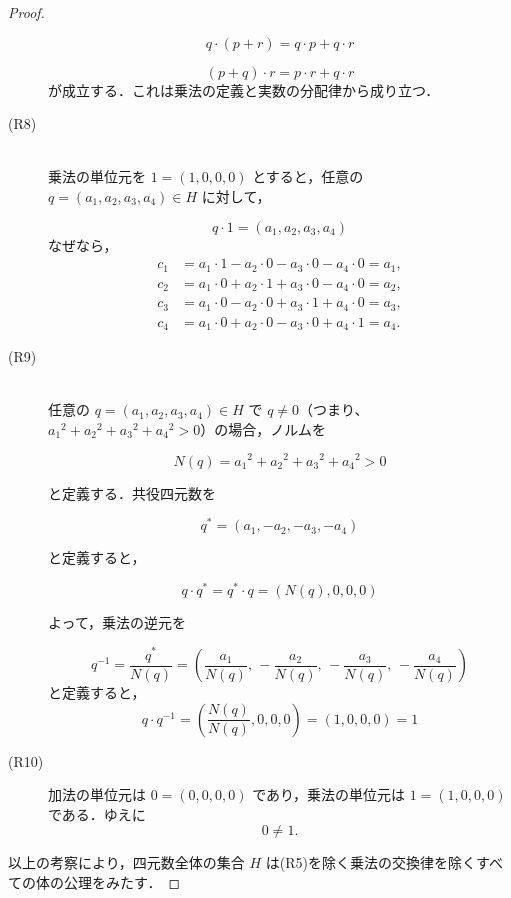 \begin{leftbar}
\begin{proof}
\begin{description}
                  \[
                      q \cdot (p + r) = q \cdot p + q \cdot r
                  \]

                  \[
                      (p + q) \cdot r = p \cdot r + q \cdot r
                  \]
                  が成立する．これは乗法の定義と実数の分配律から成り立つ．
            \item [(R8)] \mbox{} \\
                  乗法の単位元を $1 = (1, 0, 0, 0)$ とすると，任意の $q = (a_1, a_2, a_3, a_4) \in H$ に対して，

                  \[
                      q \cdot 1 = (a_1, a_2, a_3, a_4)
                  \]
                  なぜなら，
                  \begin{align*}
                      c_1 & = a_1 \cdot 1 - a_2 \cdot 0 - a_3 \cdot 0 - a_4 \cdot 0 = a_1, \\
                      c_2 & = a_1 \cdot 0 + a_2 \cdot 1 + a_3 \cdot 0 - a_4 \cdot 0 = a_2, \\
                      c_3 & = a_1 \cdot 0 - a_2 \cdot 0 + a_3 \cdot 1 + a_4 \cdot 0 = a_3, \\
                      c_4 & = a_1 \cdot 0 + a_2 \cdot 0 - a_3 \cdot 0 + a_4 \cdot 1 = a_4.
                  \end{align*}
            \item [(R9)] \mbox{} \\
                  任意の $q = (a_1, a_2, a_3, a_4) \in H$ で $q \ne 0$（つまり、${a_1}^2 + {a_2}^2 + {a_3}^2 + {a_4}^2 > 0$）の場合，ノルムを

                  \[
                      N(q) = {a_1}^2 + {a_2}^2 + {a_3}^2 + {a_4}^2 > 0
                  \]

                  と定義する．共役四元数を

                  \[
                      q^* = (a_1, -a_2, -a_3, -a_4)
                  \]

                  と定義すると，

                  \[
                      q \cdot q^* = q^* \cdot q = (N(q), 0, 0, 0)
                  \]

                  よって，乗法の逆元を

                  \[
                      q^{-1} = \frac{q^*}{N(q)} = \left( \frac{a_1}{N(q)},\, -\frac{a_2}{N(q)},\, -\frac{a_3}{N(q)},\, -\frac{a_4}{N(q)} \right)
                  \]
                  と定義すると，
                  \[
                      q \cdot q^{-1} = \left( \frac{N(q)}{N(q)}, 0, 0, 0 \right) = (1, 0, 0, 0) = 1
                  \]
            \item [(R10)]
                  加法の単位元は $0 = (0, 0, 0, 0)$ であり，乗法の単位元は $1 = (1, 0, 0, 0)$ である．ゆえに
                  \[
                      0 \ne 1.
                  \]
        \end{description}
        以上の考察により，四元数全体の集合 $H$ は(R5)を除く乗法の交換律を除くすべての体の公理をみたす．
    \end{proof}
\end{leftbar}
\newpage

